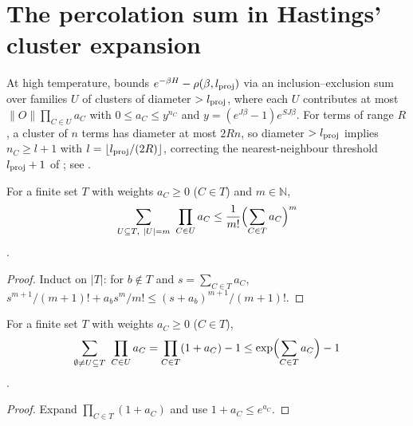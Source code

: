 \section{The percolation sum in Hastings' cluster expansion}
\label{sec:hastings_percolation}


At high temperature, \cite[lines 1196--1225]{Hastings2006Solving} bounds
$e^{-\beta H}-\rho(\beta,l_{\rm proj})$ via an inclusion--exclusion sum over
families $U$ of clusters of diameter $>l_{\rm proj}$, where each $U$ contributes
at most $\|O\|\prod_{C\in U}a_C$ with $0\le a_C\le y^{n_C}$ and
$y=(e^{J\beta}-1)e^{SJ\beta}$. For terms of range $R$, a cluster of $n$ terms
has diameter at most $2Rn$, so diameter $>l_{\rm proj}$ implies
$n_C\ge l+1$ with $l=\lfloor l_{\rm proj}/(2R)\rfloor$, correcting the
nearest-neighbour threshold $l_{\rm proj}+1$ of
\cite[line 1240]{Hastings2006Solving}; see
\cite{gap:hastings05_percolation_cluster_size}.

\begin{lemma}
    \label{thm:hastings_percolation_families}
    \leanok
    For a finite set $T$ with weights $a_C\ge0$ ($C\in T$) and $m\in\mathbb N$,
    \begin{align}
        \sum_{U\subseteq T,\ |U|=m}\ \prod_{C\in U}a_C
        \le\frac1{m!}\Bigl(\sum_{C\in T}a_C\Bigr)^m
        \label{eq:hastings_percolation_families}
    \end{align}
    \cite[line 1210]{Hastings2006Solving}.
\end{lemma}
\begin{proof}
    \leanok
    Induct on $|T|$: for $b\notin T$ and $s=\sum_{C\in T}a_C$,
    $s^{m+1}/(m+1)!+a_bs^m/m!\le(s+a_b)^{m+1}/(m+1)!$.
\end{proof}

\begin{lemma}
    \label{thm:hastings_percolation_exp}
    \leanok
    For a finite set $T$ with weights $a_C\ge0$ ($C\in T$),
    \begin{align}
        \sum_{\emptyset\ne U\subseteq T}\ \prod_{C\in U}a_C
        =\prod_{C\in T}(1+a_C)-1
        \le\exp\Bigl(\sum_{C\in T}a_C\Bigr)-1
        \label{eq:hastings_percolation_exp}
    \end{align}
    \cite[lines 1238--1241]{Hastings2006Solving}.
\end{lemma}
\begin{proof}
    \leanok
    Expand $\prod_{C\in T}(1+a_C)$ and use $1+a_C\le e^{a_C}$.
\end{proof}

